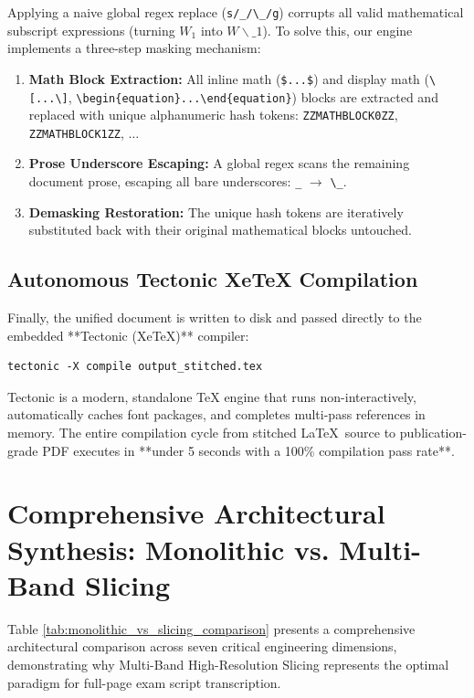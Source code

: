 Applying a naive global regex replace (\texttt{s/\_/\textbackslash\_/g}) corrupts all valid mathematical subscript expressions (turning $W_1$ into $W\backslash\_1$). To solve this, our engine implements a three-step masking mechanism:
\begin{enumerate}
    \item \textbf{Math Block Extraction:} All inline math (\texttt{\$...\$}) and display math (\texttt{\textbackslash[...\textbackslash]}, \texttt{\textbackslash begin\{equation\}...\textbackslash end\{equation\}}) blocks are extracted and replaced with unique alphanumeric hash tokens: \texttt{ZZMATHBLOCK0ZZ}, \texttt{ZZMATHBLOCK1ZZ}, $\dots$
    \item \textbf{Prose Underscore Escaping:} A global regex scans the remaining document prose, escaping all bare underscores: \texttt{\_} $\to$ \texttt{\textbackslash\_}.
    \item \textbf{Demasking Restoration:} The unique hash tokens are iteratively substituted back with their original mathematical blocks untouched.
\end{enumerate}

\subsection{Autonomous Tectonic XeTeX Compilation}
Finally, the unified document is written to disk and passed directly to the embedded **Tectonic (XeTeX)** compiler:
\begin{verbatim}
tectonic -X compile output_stitched.tex
\end{verbatim}
Tectonic is a modern, standalone TeX engine that runs non-interactively, automatically caches font packages, and completes multi-pass references in memory. The entire compilation cycle from stitched \LaTeX\ source to publication-grade PDF executes in **under 5 seconds with a 100\% compilation pass rate**.

\section{Comprehensive Architectural Synthesis: Monolithic vs. Multi-Band Slicing}
\label{sec:architectural_synthesis_matrix}

Table \ref{tab:monolithic_vs_slicing_comparison} presents a comprehensive architectural comparison across seven critical engineering dimensions, demonstrating why Multi-Band High-Resolution Slicing represents the optimal paradigm for full-page exam script transcription.

